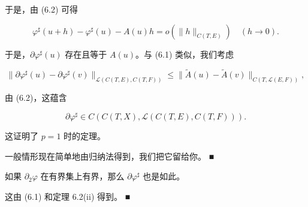 \begin{theorem}
于是，由 (6.2) 可得

\[
\varphi^{\sharp}(u + h) - \varphi^{\sharp}(u) - A(u)h = o(\|h\|_{C(T,E)}) \quad (h \to 0) .
\]

于是，$ \partial\varphi^{\sharp}(u) $ 存在且等于 $ A(u) $。与 (6.1) 类似，我们考虑

\[
\|\partial\varphi^{\sharp}(u) - \partial\varphi^{\sharp}(v)\|_{\mathcal{L}(C(T,E),C(T,F))} \le \|\widetilde{A}(u) - \widetilde{A}(v)\|_{C(T,\mathcal{L}(E,F))} ,
\]

由 (6.2)，这蕴含

\[
\partial\varphi^{\sharp} \in C(C(T, X), \mathcal{L}(C(T, E), C(T, F))) .
\]

这证明了 $ p = 1 $ 时的定理。

一般情形现在简单地由归纳法得到，我们把它留给你。 \nobreak\hspace{0.35em}■

\end{theorem}

\begin{corollary}

如果 $ \partial_{2}\varphi $ 在有界集上有界，那么 $ \partial\varphi^{\sharp} $ 也是如此。

\proofhead
这由 (6.1) 和定理 6.2(ii) 得到。 \nobreak\hspace{0.35em}■
\end{corollary}

